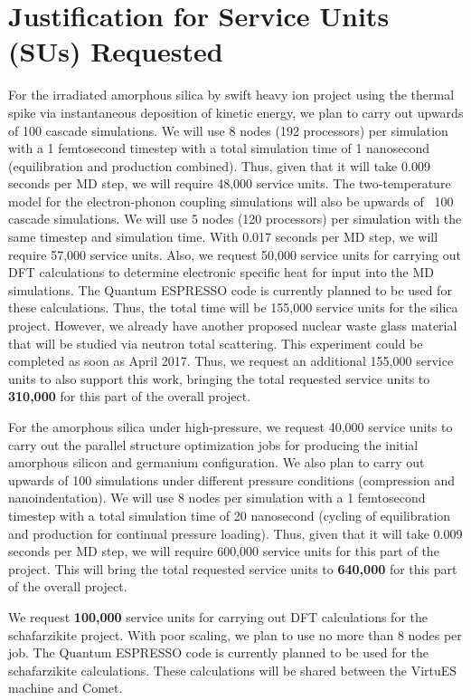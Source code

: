 \documentclass{proposalnsf}
\begin{document}
\section*{Justification for Service Units (SUs) Requested}

For the irradiated amorphous silica by swift heavy ion project using the thermal spike via instantaneous deposition of kinetic energy, we plan to carry out upwards of 100 cascade simulations. We will use 8 nodes (192 processors) per simulation with a 1 femtosecond timestep with a total simulation time of 1 nanosecond (equilibration and production combined). Thus, given that it will take 0.009 seconds per MD step, we will require 48,000 service units. The two-temperature model for the electron-phonon coupling simulations will also be upwards of ~100 cascade simulations. We will use 5 nodes (120 processors) per simulation with the same timestep and simulation time. With 0.017 seconds per MD step, we will require 57,000 service units. Also, 
we request 50,000 service units for carrying out DFT calculations to determine electronic specific heat for input into the MD simulations. The Quantum ESPRESSO code is currently planned to be used for these calculations.  Thus, the total time will be 155,000 service units  for the silica project. However, we already have another proposed nuclear waste glass material that will be studied via neutron total scattering. This experiment could be completed as soon as April 2017. Thus, we request an additional 155,000 service units to also support this work, bringing the total requested service units to \textbf{310,000} for this part of the overall project. 

For the amorphous silica under high-pressure, we request 40,000 service units to carry out the parallel structure optimization jobs for producing the initial amorphous silicon and germanium configuration. We also plan to carry out upwards of 100 simulations under different pressure conditions (compression and nanoindentation). We will use 8 nodes per simulation with a 1 femtosecond timestep with a total simulation time of 20 nanosecond (cycling of equilibration and production for continual pressure loading). Thus, given that it will take 0.009 seconds per MD step, we will require 600,000 service units for this part of the project. This will bring the total requested service units to \textbf{640,000} for this part of the overall project. 

We request \textbf{100,000} service units for carrying out DFT calculations for the schafarzikite project. With poor scaling, we plan to use no more than 8 nodes per job. The Quantum ESPRESSO code is currently planned to be used for the schafarzikite calculations. These calculations will be shared between the VirtuES machine and Comet. 
\end{document}
